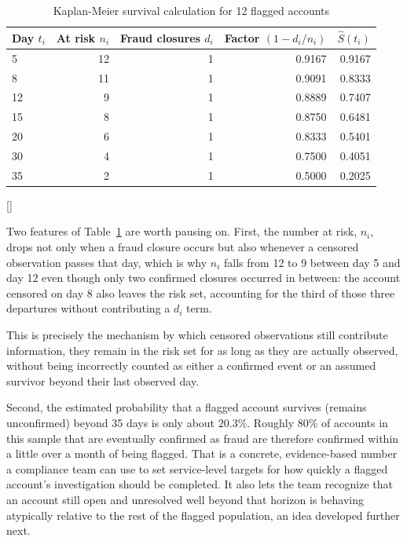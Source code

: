 \documentclass[../ai_in_finance]{subfiles}
\begin{document}
\begin{table}[htbp]
\centering
\begin{lrbox}{\bookmeasuredbox}
\begin{tabular}{lrrrr}
\toprule
Day $t_i$ & At risk $n_i$ & Fraud closures $d_i$ & Factor $(1-d_i/n_i)$ & $\hat S(t_i)$ \\
\midrule
5  & 12 & 1 & 0.9167 & 0.9167 \\
8  & 11 & 1 & 0.9091 & 0.8333 \\
12 & 9  & 1 & 0.8889 & 0.7407 \\
15 & 8  & 1 & 0.8750 & 0.6481 \\
20 & 6  & 1 & 0.8333 & 0.5401 \\
30 & 4  & 1 & 0.7500 & 0.4051 \\
35 & 2  & 1 & 0.5000 & 0.2025 \\
\bottomrule
\end{tabular}
\end{lrbox}
\ifdim\wd\bookmeasuredbox<0.65\linewidth
\setlength{\bookcapwidth}{0.65\linewidth}
\else
\setlength{\bookcapwidth}{\wd\bookmeasuredbox}
\fi
{}[\bookcapwidth]{
\usebox{\bookmeasuredbox}
}{
\caption{Kaplan-Meier survival calculation for 12 flagged accounts}
\label{tab:km_table}
}
\end{table}

Two features of Table~\ref{tab:km_table} are worth pausing on. First, the number at risk, $n_i$, drops not only when a fraud closure occurs but also whenever a censored observation passes that day, which is why $n_i$ falls from 12 to 9 between day 5 and day 12 even though only two confirmed closures occurred in between: the account censored on day 8 also leaves the risk set, accounting for the third of those three departures without contributing a $d_i$ term.

This is precisely the mechanism by which censored observations still contribute information, they remain in the risk set for as long as they are actually observed, without being incorrectly counted as either a confirmed event or an assumed survivor beyond their last observed day.

Second, the estimated probability that a flagged account survives (remains unconfirmed) beyond 35 days is only about $20.3\%$. Roughly $80\%$ of accounts in this sample that are eventually confirmed as fraud are therefore confirmed within a little over a month of being flagged. That is a concrete, evidence-based number a compliance team can use to set service-level targets for how quickly a flagged account's investigation should be completed. It also lets the team recognize that an account still open and unresolved well beyond that horizon is behaving atypically relative to the rest of the flagged population, an idea developed further next.
\end{document}
